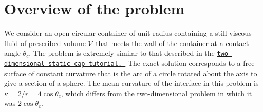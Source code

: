 \hypertarget{index_overview}{}\section{Overview of the problem}\label{index_overview}
We consider an open circular container of unit radius containing a still viscous fluid of prescribed volume $ \mathcal{V} $ that meets the wall of the container at a contact angle $ \theta_{c} $. The problem is extremely similar to that described in the \href{../../../navier_stokes/static_single_layer/html/index.html}{\tt two-\/dimensional static cap tutorial. } The exact solution corresponds to a free surface of constant curvature that is the arc of a circle rotated about the axis to give a section of a sphere. The mean curvature of the interface in this problem is $ \kappa = 2/r = 4\cos\theta_{c} $, which differs from the two-\/dimensional problem in which it was $ 2\cos\theta_{c} $.

